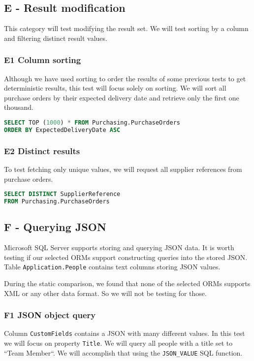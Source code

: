 \subsection{E - Result modification}
This category will test modifying the result set. We will test sorting by a column and filtering distinct result values.

\subsubsection*{E1 Column sorting}
Although we have used sorting to order the results of some previous tests to get deterministic results, this test will focus solely on sorting.
We will sort all purchase orders by their expected delivery date and retrieve only the first one thousand.

\begin{lstlisting}[language=SQL]
SELECT TOP (1000) * FROM Purchasing.PurchaseOrders 
ORDER BY ExpectedDeliveryDate ASC
\end{lstlisting}

\subsubsection*{E2 Distinct results}
To test fetching only unique values, we will request all supplier references from purchase orders.

\begin{lstlisting}[language=SQL]
SELECT DISTINCT SupplierReference 
FROM Purchasing.PurchaseOrders
\end{lstlisting}

\subsection{F - Querying JSON}
Microsoft SQL Server supports storing and querying JSON data\cite{mssqljson}. It is worth testing if our selected ORMs support constructing queries into the stored JSON.
Table \texttt{Application.People} contains text columns storing JSON values.

During the static comparison, we found that none of the selected ORMs supports XML or any other data format. So we will not be testing for those.

\subsubsection*{F1 JSON object query}

Column \texttt{CustomFields} contains a JSON with many different values. In this test we will focus on property \texttt{Title}. We will query all people with a title set to ``Team Member``.
We will accomplish that using the \texttt{JSON\_VALUE} SQL function.

